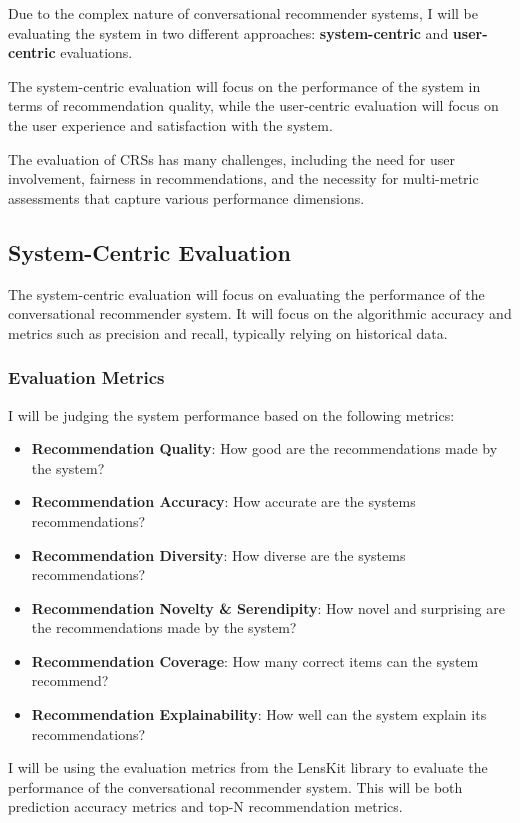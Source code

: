 
Due to the complex nature of conversational recommender systems, I will be evaluating the system in two different approaches: \textbf{system-centric} and \textbf{user-centric} evaluations. 

The system-centric evaluation will focus on the performance of the system in terms of recommendation quality, while the user-centric evaluation will focus on the user experience and satisfaction with the system.

The evaluation of CRSs has many challenges, including the need for user involvement, fairness in recommendations, 
and the necessity for multi-metric assessments that capture various performance dimensions.

\subsection{System-Centric Evaluation}
The system-centric evaluation will focus on evaluating the performance of the conversational recommender system.
It will focus on the algorithmic accuracy and metrics such as precision and recall, typically relying on historical data.

\subsubsection{Evaluation Metrics}
I will be judging the system performance based on the following metrics:
\begin{itemize}
    \item \textbf{Recommendation Quality}: How good are the recommendations made by the system?
    \item \textbf{Recommendation Accuracy}: How accurate are the systems recommendations?
    \item \textbf{Recommendation Diversity}: How diverse are the systems recommendations?
    \item \textbf{Recommendation Novelty \& Serendipity}: How novel and surprising are the recommendations made by the system?
    \item \textbf{Recommendation Coverage}: How many correct items can the system recommend?
    \item \textbf{Recommendation Explainability}: How well can the system explain its recommendations?
\end{itemize}

I will be using the evaluation metrics from the LensKit library \cite{ekstrand_2020_lenskit} to evaluate the performance of the conversational recommender system.
This will be both prediction accuracy metrics and top-N recommendation metrics.



